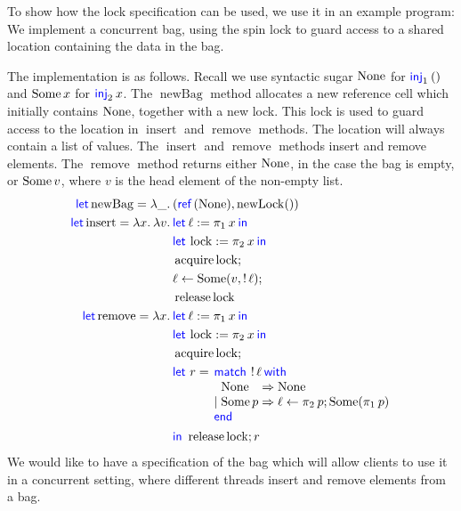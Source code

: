 To show how the lock specification can be used, we use it in an example program:
We implement a concurrent bag, using the spin lock to guard access to
a shared location containing the data in the bag. 

\newcommand{\isBag}{\operatorname{isBag}}
\newcommand{\baglist}{\operatorname{bagList}}
\newcommand{\newBag}{\operatorname{newBag}}
\newcommand{\binsert}{\operatorname{insert}}
\newcommand{\bremove}{\operatorname{remove}}
\newcommand{\lock}{\operatorname{lock}}

\begin{example}
  \label{example:course-grained-bag}
  The implementation is as follows.
  Recall we use syntactic sugar $\operatorname{None}$ for $\Inj{1} \TT$ and $\operatorname{Some} x$ for $\Inj{2} x$.
  The $\newBag$ method allocates a new reference cell which initially contains $\operatorname{None}$, together with a new lock.
  This lock is used to guard access to the location in $\binsert$ and $\bremove$ methods.
  The location will always contain a list of values.
  The $\binsert$ and $\bremove$ methods insert and remove elements.
  The $\bremove$ method returns either $\operatorname{None}$, in the case the bag is empty, or $\operatorname{Some} v$, where $v$ is the head element of the non-empty list.
  \begin{align*}
    \langkw{let} \newBag = \Lam \_ . &(\Ref(\None), \newLock \TT)\\
    \langkw{let} \binsert = \Lam x . \Lam v . &\Let \ell = \Proj{1} x in\\
                                              &\Let \lock = \Proj{2} x in\\
                                              &\acquire \lock ;\\
                                              & \ell \gets \Some (v, \deref \ell) ;\\
                                              & \release \lock\\
    \langkw{let} \bremove = \Lam x . &\Let \ell = \Proj{1} x in\\
                                     &\Let \lock = \Proj{2} x in\\
                                     &\acquire \lock ;\\
                                     &\langkw{let}\ r = \MatchML{\deref \ell}with{\None}=>{\None}|{\Some p}=>{\ell \gets \Proj{2}{p} ; \Some (\Proj{1}{p})}end{} \\
                                     & \langkw{in}\ \release \lock ; r
  \end{align*}
  We would like to have a specification of the bag which will allow
  clients to use it in a concurrent setting, where different threads insert and remove elements from a bag.


\end{example}
